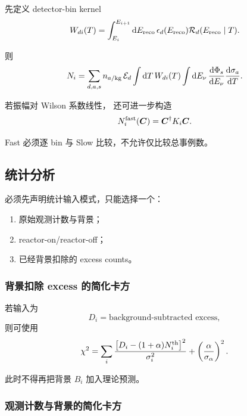 先定义 detector-bin kernel
\begin{equation}
  W_{di}(T)
  =
  \int_{E_i}^{E_{i+1}}
  \mathrm d E_{\rm reco}\,
  \epsilon_d(E_{\rm reco})
  \mathcal R_d(E_{\rm reco}\mid T).
\end{equation}

则
\begin{equation}
  N_i
  =
  \sum_{d,a,s}
  n_{a/{\rm kg}}\,
  \mathcal E_d
  \int\mathrm d T\,
  W_{di}(T)
  \int\mathrm d E_\nu\,
  \frac{\mathrm d\Phi_s}{\mathrm d E_\nu}
  \frac{\mathrm d\sigma_a}{\mathrm d T}.
\end{equation}

若振幅对 Wilson 系数线性，
还可进一步构造
\begin{equation}
  N_i^{\rm fast}(\boldsymbol C)
  =
  \boldsymbol C^\dagger
  K_i
  \boldsymbol C.
\end{equation}

Fast 必须逐 bin 与 Slow 比较，不允许仅比较总事例数。

\subsection{统计分析}

必须先声明统计输入模式，只能选择一个：
\begin{enumerate}
  \item 原始观测计数与背景；
  \item reactor-on/reactor-off；
  \item 已经背景扣除的 excess counts。
\end{enumerate}

\subsubsection{背景扣除 excess 的简化卡方}

若输入为
\begin{equation}
  D_i
  =
  \text{background-subtracted excess},
\end{equation}
则可使用
\begin{equation}
  \chi^2
  =
  \sum_i
  \frac{
    \left[
      D_i-(1+\alpha)N_i^{\rm th}
    \right]^2
  }{
    \sigma_i^2
  }
  +
  \left(
    \frac{\alpha}{\sigma_\alpha}
  \right)^2.
\end{equation}

此时不得再把背景 $B_i$ 加入理论预测。

\subsubsection{观测计数与背景的简化卡方}

